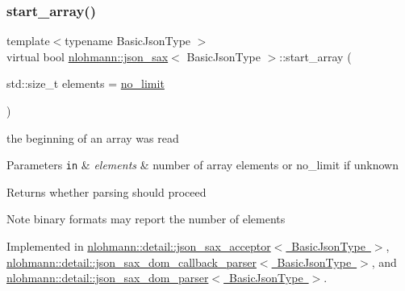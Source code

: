 \subsubsection{\texorpdfstring{start\+\_\+array()}{start\_array()}}
{\footnotesize\ttfamily template$<$typename Basic\+Json\+Type $>$ \\
virtual bool \mbox{\hyperlink{structnlohmann_1_1json__sax}{nlohmann\+::json\+\_\+sax}}$<$ Basic\+Json\+Type $>$\+::start\+\_\+array (\begin{DoxyParamCaption}\item[{std\+::size\+\_\+t}]{elements = {\ttfamily \mbox{\hyperlink{structnlohmann_1_1json__sax_a84031c6bbd5b85ec13da024fe9e2b9c9}{no\+\_\+limit}}} }\end{DoxyParamCaption})\hspace{0.3cm}{\ttfamily [pure virtual]}}



the beginning of an array was read 


\begin{DoxyParams}[1]{Parameters}
\mbox{\tt in}  & {\em elements} & number of array elements or no\+\_\+limit if unknown \\
\hline
\end{DoxyParams}
\begin{DoxyReturn}{Returns}
whether parsing should proceed 
\end{DoxyReturn}
\begin{DoxyNote}{Note}
binary formats may report the number of elements 
\end{DoxyNote}


Implemented in \mbox{\hyperlink{classnlohmann_1_1detail_1_1json__sax__acceptor_aa71d9a89f01f3aa31f573991def61f08}{nlohmann\+::detail\+::json\+\_\+sax\+\_\+acceptor$<$ Basic\+Json\+Type $>$}}, \mbox{\hyperlink{classnlohmann_1_1detail_1_1json__sax__dom__callback__parser_ad3ec763c78876bf84f3874ebb0a3df26}{nlohmann\+::detail\+::json\+\_\+sax\+\_\+dom\+\_\+callback\+\_\+parser$<$ Basic\+Json\+Type $>$}}, and \mbox{\hyperlink{classnlohmann_1_1detail_1_1json__sax__dom__parser_a888d06ee0dfe01a5e6acd92ad9e2804c}{nlohmann\+::detail\+::json\+\_\+sax\+\_\+dom\+\_\+parser$<$ Basic\+Json\+Type $>$}}.

\mbox{\label{structnlohmann_1_1json__sax_a447db60efaabc614492c449e640719cf}} 
